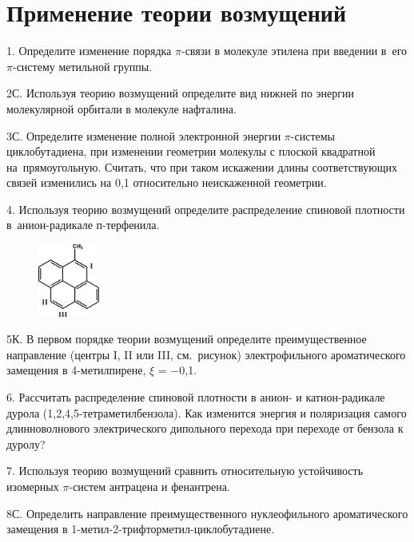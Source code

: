 \setmainfont{Noto Serif}
\setsansfont{Noto Sans}
\setmonofont{Noto Sans Mono}


\section{Применение теории возмущений}
1. Определите изменение порядка $\pi$-связи в молекуле этилена при введении в~его $\pi$-систему метильной группы.
\par
2С. Используя теорию возмущений определите вид нижней по энергии молекулярной орбитали в молекуле нафталина.
\par
3С. Определите изменение полной электронной энергии $\pi$-системы циклобутадиена, при изменении геометрии молекулы с плоской квадратной на~прямоугольную. Считать, что при таком искажении длины соответствующих связей изменились на 0,1 относительно неискаженной геометрии.
\par
4. Используя теорию возмущений определите распределение спиновой плотности в~анион-радикале п-терфенила.
\par
\begin{figure} %
    \centering
    \vspace{-7ex}
    \includegraphics[width=20mm]{images/Fig_1_9_6.png}
    \vspace{-6ex}
\end{figure}
5К. В первом порядке теории возмущений определите преимущественное направление (центры I, II или III, см.~рисунок) электрофильного ароматического замещения в 4-метилпирене, $\xi$ = $-$0,1.
\par
6. Рассчитать распределение спиновой плотности в анион- и катион-радикале дурола (1,2,4,5-тетраметилбензола). Как изменится энергия и поляризация самого длинноволнового электрического дипольного перехода при переходе от бензола к дуролу?
\par
7. Используя теорию возмущений сравнить относительную устойчивость изомерных $\pi$-систем антрацена и фенантрена.
\par
8С. Определить направление преимущественного нуклеофильного ароматического замещения в 1-метил-2-трифторметил-циклобутадиене.
\par
